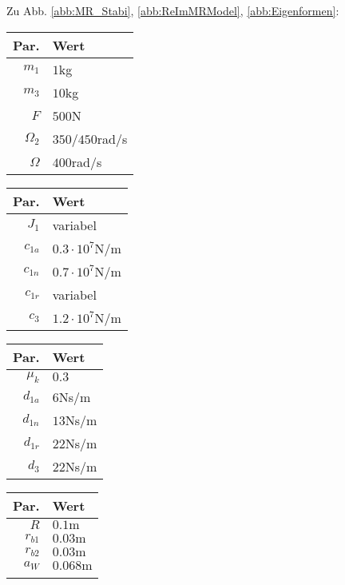 Zu Abb. \ref{abb:MR_Stabi}, \ref{abb:ReImMRModel}, \ref{abb:Eigenformen}:
\begin{center}
\begin{tabular}{r|l}
Par. &Wert\\\hline
$m_1$&$1$kg\\
$m_3$&$10$kg\\
$F$&$500$N\\
$\Omega_2$&$350/450$rad/s\\
$\Omega$&$400$rad/s
\end{tabular} \hfill
\begin{tabular}{r|l}
Par. &Wert\\\hline
$J_1$& variabel\\
$c_{1a}$&$0.3\cdot10^{7}$N/m\\
$c_{1n}$&$0.7\cdot10^{7}$N/m \\
$c_{1r}$ &variabel\\
$c_{3}$ & $1.2\cdot10^{7}$N/m
\end{tabular} \hfill
\begin{tabular}{r|l}
Par. &Wert\\\hline
$\mu_k$& $0.3$\\
$d_{1a}$&$6$Ns/m\\
$d_{1n}$&$13$Ns/m \\
$d_{1r}$ &$22$Ns/m\\
$d_{3}$ & $22$Ns/m
\end{tabular} \hfill
\begin{tabular}{r|l}
Par. &Wert\\\hline
$R$&$0.1\textrm{m}$ \\
$r_{b1}$&$ 0.03\textrm{m}$\\
$r_{b2}$&$ 0.03\textrm{m}$\\
$a_{W}$&$ 0.068\textrm{m}$\\
&
\end{tabular}
\end{center}

